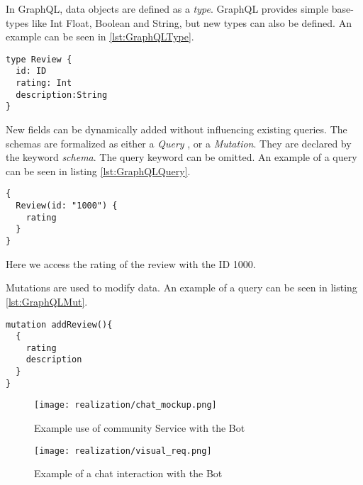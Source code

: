 In GraphQL, data objects are defined as a \emph{type}. GraphQL provides simple base-types like Int Float, Boolean and String, but new types can also be defined. An example can be seen in \ref{lst:GraphQLType}.
\begin{lstlisting}[caption={Example of a GraphQL schema},captionpos=b,label={lst:GraphQLType}]
type Review {
  id: ID
  rating: Int
  description:String
}
\end{lstlisting}
New fields can be dynamically added without influencing existing queries. The schemas are formalized as either a \emph{Query }, or a \emph{Mutation}. They are declared by the keyword \emph{schema}. The query keyword can be omitted. An example of a query can be seen in listing \ref{lst:GraphQLQuery}.
\begin{lstlisting}[caption={Example of a GraphQL Query},captionpos=b,label={lst:GraphQLQuery}]
{
  Review(id: "1000") {
    rating
  }
}
\end{lstlisting}
Here we access the rating of the review with the ID 1000.

Mutations are used to modify data. An example of a query can be seen in listing \ref{lst:GraphQLMut}.
\begin{lstlisting}[caption={Example of a GraphQL Mutation},captionpos=b,label={lst:GraphQLMut}]
mutation addReview(){
  {
	rating 
	description
  }
}
\end{lstlisting}

\begin{figure}[h]
  \centering
  \texttt{[image: realization/chat\_mockup.png]}
  \caption{Example use of community Service with the Bot}
  \label{fig:chatMockup}
\end{figure}

\begin{figure}[h]
  \centering
  \texttt{[image: realization/visual\_req.png]}
  \caption{Example of a chat interaction with the Bot}
  \label{fig:visualReq}
\end{figure}